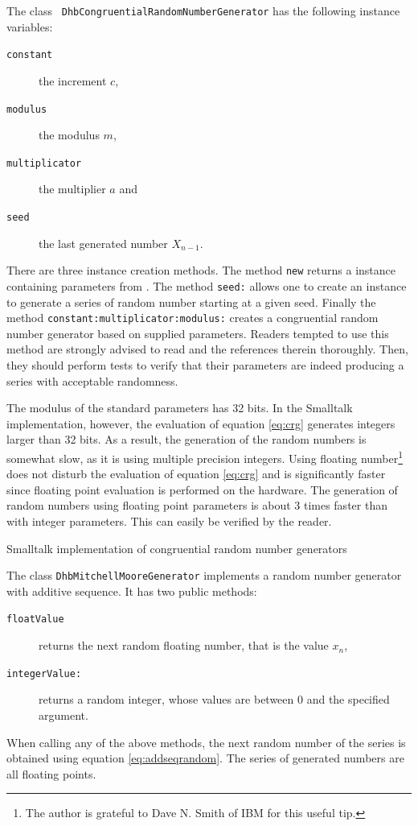  The class {\tt
DhbCongruentialRandomNumberGenerator} has the following instance
variables:
\begin{description}
  \item[\tt constant] the increment $c$,
  \item[\tt modulus] the modulus $m$,
  \item[\tt multiplicator] the multiplier $a$ and
  \item[\tt seed] the last generated number $X_{n-1}$.
\end{description}
There are three instance creation methods. The method {\tt new}
returns a  instance containing parameters from
\cite{Knuth2}. The method {\tt seed:} allows one to create an
instance to generate a series of random number starting at a given
seed. Finally the method {\tt constant:multiplicator:modulus:}
creates a congruential random number generator based on supplied
parameters. Readers tempted to use this method are strongly
advised to read \cite{Knuth2} and the references therein
thoroughly. Then, they should perform tests to verify that their
parameters are indeed producing a series with acceptable
randomness.

The modulus of the standard parameters has 32 bits. In the
Smalltalk implementation, however, the evaluation of equation
\ref{eq:crg} generates integers larger than 32 bits. As a result,
the generation of the random numbers is somewhat slow, as it is
using multiple precision integers. Using floating
number\footnote{The author is grateful to Dave N. Smith of IBM for
this useful tip.} does not disturb the evaluation of equation
\ref{eq:crg} and is significantly faster since floating point
evaluation is performed on the hardware. The generation of random
numbers using floating point parameters is about 3 times faster
than with integer parameters. This can easily be verified by the
reader.

\begin{listing} Smalltalk implementation of congruential random number generators
\label{ls:randomcong}

\end{listing}

\noindent The class {\tt DhbMitchellMooreGenerator} implements a
random number generator with additive sequence. It has two public
methods:
\begin{description}
  \item[\tt floatValue] returns the next random floating number,
  that is the value $x_n$,
  \item[\tt integerValue:] returns a random integer, whose values
  are between 0 and the specified argument.
\end{description}
When calling any of the above methods, the next random number of
the series is obtained using equation \ref{eq:addseqrandom}. The
series of generated numbers are all floating points.

